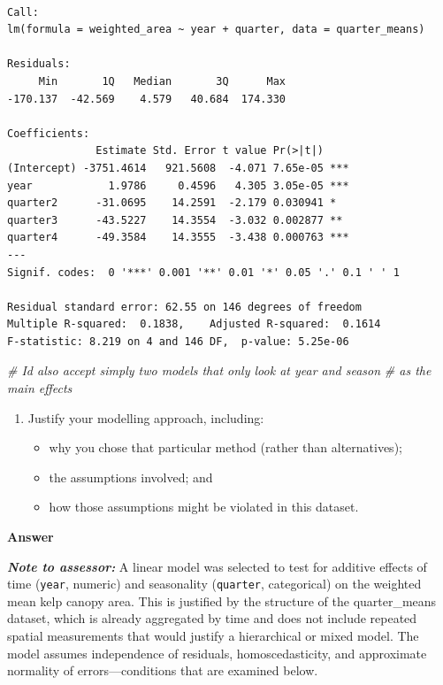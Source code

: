 \documentclass[
  british,
  10pt,
]{article}
\newenvironment{Shaded}{\begin{snugshade}}{\end{snugshade}}
\newcommand{\CommentTok}[1]{\textcolor[rgb]{0.56,0.35,0.01}{\textit{#1}}}
\providecommand{\tightlist}{%
  \setlength{\itemsep}{0pt}\setlength{\parskip}{0pt}}
\let\oldtexttt\texttt
\renewcommand{\texttt}[1]{\oldtexttt{\small #1}}
\begin{document}
\begin{verbatim}

Call:
lm(formula = weighted_area ~ year + quarter, data = quarter_means)

Residuals:
     Min       1Q   Median       3Q      Max 
-170.137  -42.569    4.579   40.684  174.330 

Coefficients:
              Estimate Std. Error t value Pr(>|t|)    
(Intercept) -3751.4614   921.5608  -4.071 7.65e-05 ***
year            1.9786     0.4596   4.305 3.05e-05 ***
quarter2      -31.0695    14.2591  -2.179 0.030941 *  
quarter3      -43.5227    14.3554  -3.032 0.002877 ** 
quarter4      -49.3584    14.3555  -3.438 0.000763 ***
---
Signif. codes:  0 '***' 0.001 '**' 0.01 '*' 0.05 '.' 0.1 ' ' 1

Residual standard error: 62.55 on 146 degrees of freedom
Multiple R-squared:  0.1838,    Adjusted R-squared:  0.1614 
F-statistic: 8.219 on 4 and 146 DF,  p-value: 5.25e-06
\end{verbatim}

\begin{Shaded}
\begin{Highlighting}[]
\CommentTok{\# I\textquotesingle{}d also accept simply two models that only look at year and season}
\CommentTok{\# as the main effects}
\end{Highlighting}
\end{Shaded}

\begin{enumerate}
\def\labelenumi{\arabic{enumi}.}
\setcounter{enumi}{2}
\tightlist
\item
  Justify your modelling approach, including:

  \begin{itemize}
  \tightlist
  \item
    why you chose that particular method (rather than alternatives);
  \item
    the assumptions involved; and
  \item
    how those assumptions might be violated in this dataset.
  \end{itemize}
\end{enumerate}

\textbf{Answer}

\textbf{\emph{Note to assessor:}} A linear model was selected to test
for additive effects of time (\texttt{year}, numeric) and seasonality
(\texttt{quarter}, categorical) on the weighted mean kelp canopy area.
This is justified by the structure of the quarter\_means dataset, which
is already aggregated by time and does not include repeated spatial
measurements that would justify a hierarchical or mixed model. The model
assumes independence of residuals, homoscedasticity, and approximate
normality of errors---conditions that are examined below.
\end{document}
